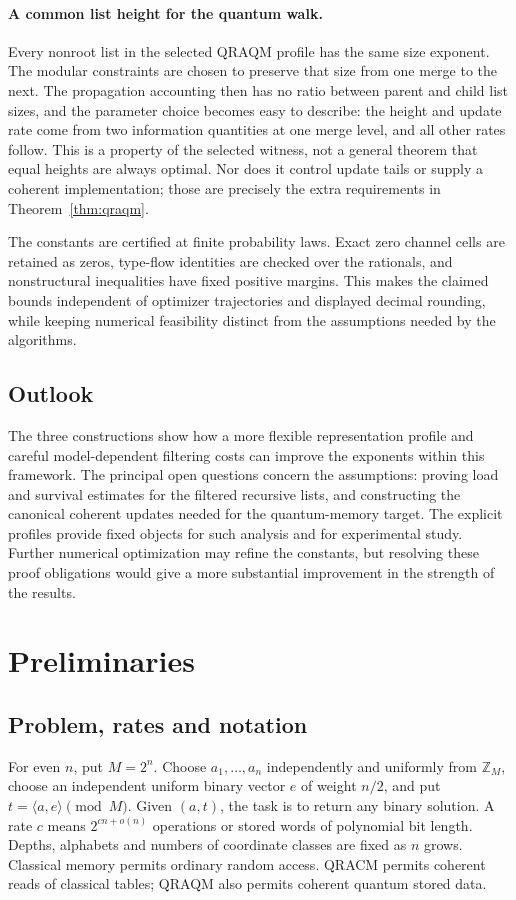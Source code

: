 \documentclass[10pt,a4paper]{article}
\theoremstyle{definition}
\begin{document}
\paragraph{A common list height for the quantum walk.}
Every nonroot list in the selected QRAQM profile has the same size
exponent. The modular constraints are chosen to preserve that size from
one merge to the next. The propagation accounting then has no ratio between
parent and child list sizes, and the parameter choice becomes easy to
describe: the height and update rate come from two
information quantities at one merge level, and all other rates follow.
This is a property of the selected witness, not a general theorem that
equal heights are always optimal. Nor does it control update tails or
supply a coherent implementation; those are precisely the extra
requirements in Theorem~\ref{thm:qraqm}.

The constants are certified at finite probability laws. Exact zero
channel cells are retained as zeros, type-flow identities are checked
over the rationals, and nonstructural inequalities have fixed positive
margins. This makes the claimed bounds independent of optimizer
trajectories and displayed decimal rounding, while keeping numerical
feasibility distinct from the assumptions needed by the algorithms.

\subsection{Outlook}
The three constructions show how a more flexible representation profile
and careful model-dependent filtering costs can improve the exponents
within this framework. The principal open questions concern the
assumptions: proving load and survival estimates for the filtered
recursive lists, and constructing the canonical coherent updates needed
for the quantum-memory target. The explicit profiles provide fixed
objects for such analysis and for experimental study. Further numerical
optimization may refine the constants, but resolving these proof
obligations would give a more substantial improvement in the strength
of the results.



\section{Preliminaries}\label{sec:preliminaries}
\subsection{Problem, rates and notation}
For even $n$, put $M=2^n$. Choose $a_1,\ldots,a_n$ independently and
uniformly from $\mathbb Z_M$, choose an independent uniform binary vector
$e$ of weight $n/2$, and put $t=\langle a,e\rangle\pmod M$.
Given $(a,t)$, the task is to return any binary solution. A rate $c$
means $2^{cn+o(n)}$ operations or stored words of polynomial bit length.
Depths, alphabets and numbers of coordinate classes are fixed as $n$ grows.
Classical memory permits ordinary random access. QRACM permits coherent
reads of classical tables; QRAQM also permits coherent quantum stored data.
\end{document}
